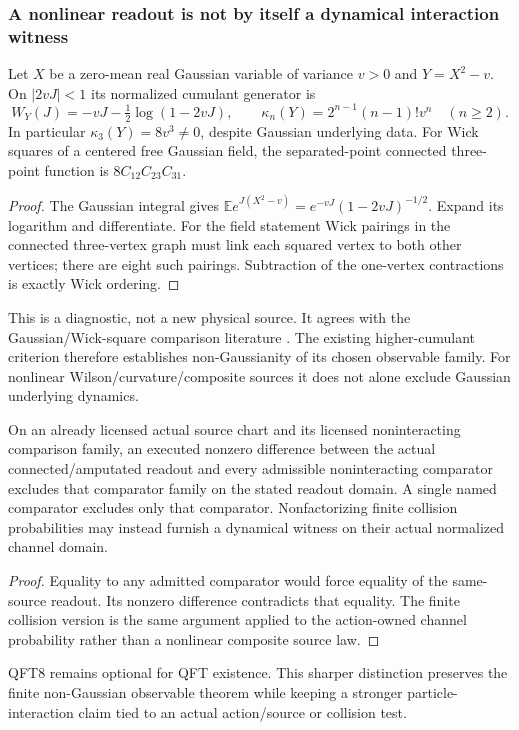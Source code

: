 \documentclass[12pt,a4paper]{article}
\begin{document}
\subsubsection{A nonlinear readout is not by itself a dynamical interaction witness}
\begin{proposition}
\label{p12:prop:v2210-lit-composite-cumulant}
Let $X$ be a zero-mean real Gaussian variable of variance $v>0$ and
$Y=X^2-v$. On $|2vJ|<1$ its normalized cumulant generator is
\[
 W_Y(J)=-vJ-\tfrac12\log(1-2vJ),\qquad
 \kappa_n(Y)=2^{n-1}(n-1)!v^n\quad(n\ge2).
\]
In particular $\kappa_3(Y)=8v^3\ne0$, despite Gaussian underlying data.
For Wick squares of a centered free Gaussian field, the separated-point
connected three-point function is $8C_{12}C_{23}C_{31}$.
\end{proposition}
\begin{proof}
The Gaussian integral gives
$\mathbb E e^{J(X^2-v)}=e^{-vJ}(1-2vJ)^{-1/2}$.
Expand its logarithm and differentiate. For the field statement Wick
pairings in the connected three-vertex graph must link each squared vertex
to both other vertices; there are eight such pairings. Subtraction of the
one-vertex contractions is exactly Wick ordering.
\end{proof}
This is a diagnostic, not a new physical source. It agrees with the
Gaussian/Wick-square comparison literature
\cite{LitQFTDangWickSquares2022}. The existing higher-cumulant criterion
therefore establishes non-Gaussianity of its chosen observable family.
For nonlinear Wilson/curvature/composite sources it does not alone exclude
Gaussian underlying dynamics.

\begin{corollary}
\label{p12:cor:v2210-lit-interaction-comparator}
On an already licensed actual source chart and its licensed noninteracting
comparison family, an executed nonzero difference between the actual
connected/amputated readout and every admissible noninteracting comparator
excludes that comparator family on the stated readout domain. A single
named comparator excludes only that comparator. Nonfactorizing finite
collision probabilities may instead furnish a dynamical witness on their
actual normalized channel domain.
\end{corollary}
\begin{proof}
Equality to any admitted comparator would force equality of the same-source
readout. Its nonzero difference contradicts that equality. The finite
collision version is the same argument applied to the action-owned channel
probability rather than a nonlinear composite source law.
\end{proof}
QFT8 remains optional for QFT existence. This sharper distinction preserves
the finite non-Gaussian observable theorem while keeping a stronger
particle-interaction claim tied to an actual action/source or collision test.
\end{document}
